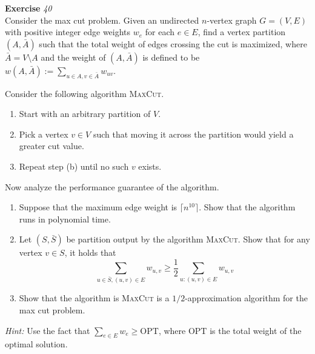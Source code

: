 \documentclass[a4paper,10pt]{article}
\newcounter{aufgc}
\newenvironment{exercise}[1]%
{\refstepcounter{aufgc}\textbf{Exercise \arabic{aufgc}} \emph{#1}\\}
{
	
	\hrulefill\medskip}%
\begin{document}
\begin{exercise}{40}
	Consider the max cut problem. Given an undirected $n$-vertex graph $G =(V,E)$ with positive integer edge weights $w_e$ for each $e\in E$, find a vertex partition $(A,\bar{A})$ such that the total weight of edges crossing the cut is maximized, where $\bar{A}=V\setminus A$ and the weight of $(A,\bar{A})$ is defined to be %
	$w(A,\bar{A}):=\sum_{u\in A,v\in \bar{A}} w_{uv}$.

	\vspace{5em}

	Consider the following algorithm \textsc{MaxCut}.
	\begin{enumerate}
		\item Start with an arbitrary partition of $V$.
		      \item\label{step2} Pick a vertex $v\in V$ such that moving it across the partition would yield a greater cut value.
		\item Repeat step (b) until no such $v$ exists.
	\end{enumerate}

	Now analyze the performance guarantee of the algorithm.
	\begin{enumerate}
		\item Suppose that the maximum edge weight is $\lceil n^{10}\rceil$. Show that the algorithm runs in polynomial time.
		\item Let $(S,\bar{S})$ be partition output by the algorithm \textsc{MaxCut}. Show that for any vertex $v\in S$, it holds that
		      \[
			      \sum_{u\in \bar{S}, (u,v)\in E} w_{u,v}\geq \frac{1}{2}\sum_{u:(u,v)\in E} w_{u,v}
		      \]
		\item Show that the algorithm is \textsc{MaxCut} is a $1/2$-approximation algorithm for the max cut problem.
	\end{enumerate}

	\medskip
	\emph{Hint:} Use the fact that $\sum_{e\in E} w_e\geq \mathrm{OPT}$, where $\mathrm{OPT}$ is the total weight of the optimal solution.



\end{exercise}
\end{document}
